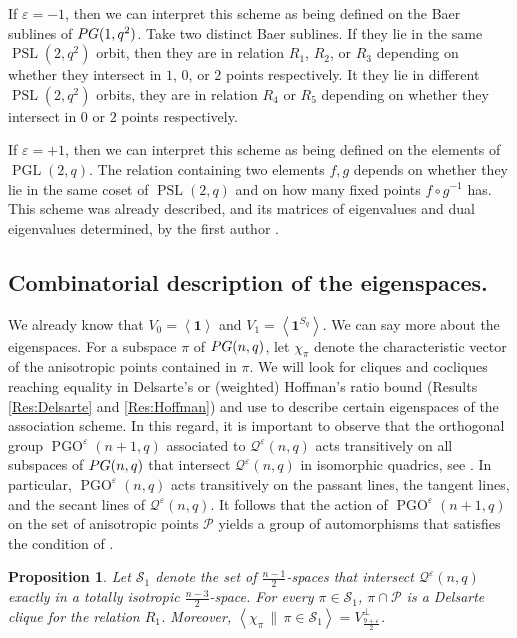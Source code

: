 \documentclass[a4paper]{article}
\newtheorem{prop}[thm]{Proposition}
\theoremstyle{definition}
\newcommand{\eps}{\varepsilon}
\newcommand{\vspan}[1]{\left \langle #1 \right \rangle}
\newcommand{\vspann}[2]{\left \langle #1 \, \| \, #2 \right \rangle}
\newcommand{\pg}{\textnormal{PG}}
\newcommand{\one}{\mathbf 1}
\newcommand{\pp}{\mathcal P}
\newcommand{\mq}{\mathcal Q}
\newcommand{\ms}{\mathcal S}
\DeclareMathOperator{\PGL}{PGL}
\DeclareMathOperator{\PSL}{PSL}
\DeclareMathOperator{\PGO}{PGO}
\begin{document}
If $\eps=-1$, then we can interpret this scheme as being defined on the Baer sublines of $\pg(1,q^2)$.
Take two distinct Baer sublines.
If they lie in the same $\PSL(2,q^2)$ orbit, then they are in relation $R_1$, $R_2$, or $R_3$ depending on whether they intersect in $1$, $0$, or $2$ points respectively.
It they lie in different $\PSL(2,q^2)$ orbits, they are in relation $R_4$ or $R_5$ depending on whether they intersect in $0$ or $2$ points respectively.

If $\eps=+1$, then we can interpret this scheme as being defined on the elements of $\PGL(2,q)$.
The relation containing two elements $f,g$ depends on whether they lie in the same coset of $\PSL(2,q)$ and on how many fixed points $f \circ g^{-1}$ has.
This scheme was already described, and its matrices of eigenvalues and dual eigenvalues determined, by the first author \cite[\S 3]{adriaensen2022stability}.



\subsection{Combinatorial description of the eigenspaces.}

We already know that $V_0 = \vspan \one$ and $V_1 = \vspan{\one^{S_q}}$.
We can say more about the eigenspaces.
For a subspace $\pi$ of $\pg(n,q)$, let $\chi_\pi$ denote the characteristic vector of the anisotropic points contained in $\pi$.
We will look for cliques and cocliques reaching equality in Delsarte's or (weighted) Hoffman's ratio bound (Results \ref{Res:Delsarte} and \ref{Res:Hoffman}) and use  to describe certain eigenspaces of the association scheme.
In this regard, it is important to observe that the orthogonal group $\PGO^\eps(n+1,q)$ associated to $\mq^\eps(n,q)$ acts transitively on all subspaces of $\pg(n,q)$ that intersect $\mq^\eps(n,q)$ in isomorphic quadrics, see \cite[Theorem 1.49]{hirschfeldthas}.
In particular, $\PGO^\eps(n,q)$ acts transitively on the passant lines, the tangent lines, and the secant lines of $\mq^\eps(n,q)$.
It follows that the action of $\PGO^\eps(n+1,q)$ on the set of anisotropic points $\pp$ yields a group of automorphisms that satisfies the condition of .

\begin{prop}
 \label{Prop:R1Delsarte}
 Let $\ms_1$ denote the set of $\frac{n-1}2$-spaces that intersect $\mq^\eps(n,q)$ exactly in a totally isotropic $\frac{n-3}2$-space.
 For every $\pi \in \ms_1$, $\pi \cap \pp$ is a Delsarte clique for the relation $R_1$.
 Moreover, $\vspann{\chi_\pi}{\pi \in \ms_1} = V_\frac{9+\eps}2^\perp$.
\end{prop}
\end{document}
